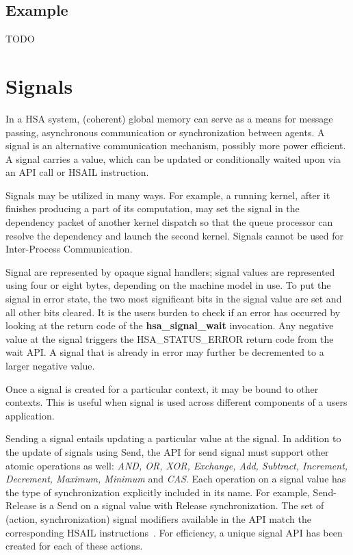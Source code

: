 \documentclass[final]{book}
\newcommand{\mariotodo}[1]{\todo[color=CarnationPink]{#1}}
\newcommand{\reffun}[1]{\textbf{#1}}
\newcommand{\reftyp}[1]{#1}
\newcommand{\refenu}[1]{\reftyp{#1}}
\begin{document}
\hypertarget{topology_example}{} \subsection{Example}
TODO

\hypertarget{signals}{}\section{Signals}
\label{signals}

In a HSA system, (coherent) global memory can serve as a means for message
passing, asynchronous communication or synchronization between agents. A signal
is an alternative communication mechanism, possibly more power efficient. A
signal carries a value, which can be updated or conditionally waited upon via an
API call or HSAIL instruction.

Signals may be utilized in many ways. For example, a running kernel, after it
finishes producing a part of its computation, may set the signal in the
dependency packet of another kernel dispatch so that the queue processor can
resolve the dependency and launch the second kernel. Signals cannot be used for
Inter-Process Communication.

Signal are represented by opaque signal handlers; signal values are represented
using four or eight bytes, depending on the machine model in use. To put the
signal in error state, the two most significant bits in the signal value are set
and all other bits cleared. It is the users burden to check if an error has
occurred by looking at the return code of the \reffun{hsa_signal_wait}
invocation. Any negative value at the signal triggers the
\refenu{HSA_STATUS_ERROR} return code from the wait API. A signal that is
already in error may further be decremented to a larger negative value.

\mariotodo{signal creation missing}Once a signal is created for a particular
context, it may be bound to other contexts. This is useful when signal is used
across different components of a users application.

Sending a signal entails updating a particular value at the signal. In addition
to the update of signals using Send, the API for send signal must support other
atomic operations as well: \emph {AND, OR, XOR, Exchange, Add, Subtract,
  Increment, Decrement, Maximum, Minimum} and \emph{CAS}. Each operation on a
signal value has the type of synchronization explicitly included in its
name. For example, Send-Release is a Send on a signal value with Release
synchronization. The set of (action, synchronization) signal modifiers available
in the API match the corresponding HSAIL instructions~\cite{prm}. For
efficiency, a unique signal API has been created for each of these actions.
\end{document}
